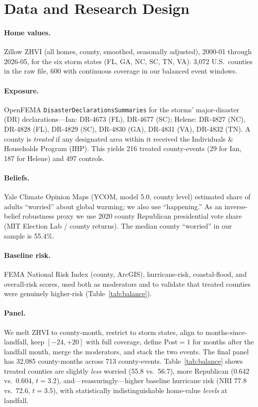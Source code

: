 \documentclass[12pt]{article}
\begin{document}
\section{Data and Research Design}\label{sec:data}
\paragraph{Home values.} Zillow ZHVI (all homes, county, smoothed, seasonally adjusted),
2000-01 through 2026-05, for the six storm states (FL, GA, NC, SC, TN, VA): 3{,}072 U.S.\
counties in the raw file, 600 with continuous coverage in our balanced event windows.

\paragraph{Exposure.} OpenFEMA \texttt{Dis\-aster\-Declarations\-Summaries} for the storms'
major-disaster (DR) declarations---Ian: DR-4673 (FL), DR-4677 (SC); Helene: DR-4827 (NC),
DR-4828 (FL), DR-4829 (SC), DR-4830 (GA), DR-4831 (VA), DR-4832 (TN). A county is
\emph{treated} if any designated area within it received the Individuals \& Households
Program (IHP). This yields 216 treated county-events (29 for Ian, 187 for Helene) and 497
controls.

\paragraph{Beliefs.} Yale Climate Opinion Maps (YCOM, model 5.0, county level) estimated
share of adults ``worried'' about global warming; we also use ``happening.'' As an
inverse-belief robustness proxy we use 2020 county Republican presidential vote share (MIT
Election Lab / county returns). The median county ``worried'' in our sample is 55.4\%.

\paragraph{Baseline risk.} FEMA National Risk Index (county, ArcGIS), hurricane-risk,
coastal-flood, and overall-risk scores, used both as moderators and to validate that treated
counties were genuinely higher-risk (Table~\ref{tab:balance}).

\paragraph{Panel.} We melt ZHVI to county-month, restrict to storm states, align to
months-since-landfall, keep $[-24,+20]$ with full coverage, define $\text{Post}=1$ for months
after the landfall month, merge the moderators, and stack the two events. The final panel has
32{,}085 county-months across 713 county-events. Table~\ref{tab:balance} shows treated
counties are slightly \emph{less} worried (55.8 vs.\ 56.7), more Republican (0.642 vs.\ 0.604,
$t=3.2$), and---reassuringly---higher baseline hurricane risk (NRI 77.8 vs.\ 72.6, $t=3.5$),
with statistically indistinguishable home-value \emph{levels} at landfall.
\end{document}
